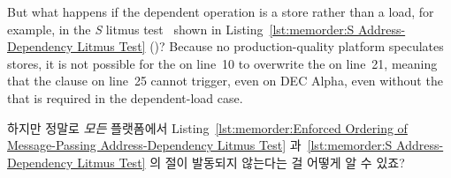 But what happens if the dependent operation is a store rather than
a load, for example, in the \emph{S}
litmus test~\cite{JadeAlglave2011ppcmem} shown in
Listing~\ref{lst:memorder:S Address-Dependency Litmus Test}
()?
Because no production-quality platform speculates stores,
it is not possible for the  on line~10 to overwrite
the  on line~21, meaning that the 
clause on line~25 cannot trigger, even on DEC Alpha, even
without the  that is required in the
dependent-load case.
\fi

\QuickQuiz{}
	하지만 정말로 \emph{모든} 플랫폼에서
	Listing~\ref{lst:memorder:Enforced Ordering of Message-Passing Address-Dependency Litmus Test}
	과~\ref{lst:memorder:S Address-Dependency Litmus Test} 의 
	절이 발동되지 않는다는 걸 어떻게 알 수 있죠?
	\iffalse

